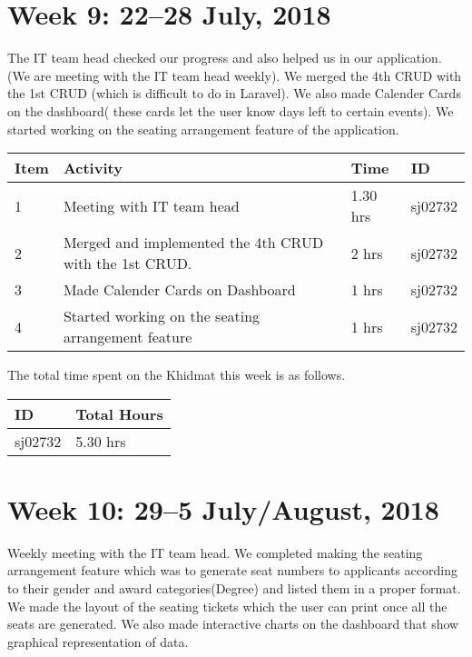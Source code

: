 \documentclass{article}
\begin{document}
\newpage %
\section*{Week 9: 22--28 July, 2018}

The IT team head checked our progress and also helped us in our application. (We are meeting with the IT team head weekly). We merged the 4th CRUD with the 1st CRUD (which is difficult to do in Laravel). We also made Calender Cards on the dashboard( these cards let the user know days left to certain events). We started working on the seating arrangement feature of the application. \newline

\begin{tabular}{|l|l|l|l|}
  \hline
  Item 	& Activity & Time & ID \\\hline\hline
  1	& Meeting with IT team head & 1.30 hrs & sj02732 \\\hline
  2	& Merged and implemented the 4th CRUD with the 1st CRUD. & 2 hrs & sj02732 \\\hline
  3	& Made Calender Cards on Dashboard & 1 hrs & sj02732 \\\hline
  4	& Started working on the seating arrangement feature  & 1 hrs & sj02732 \\\hline
\end{tabular}
\newline
The total time spent on the Khidmat this week is as follows.

\begin{tabular}{|l|l|}
  \hline
  ID & Total Hours\\\hline\hline
  sj02732 & 5.30 hrs\\\hline
\end{tabular}

\newpage %
\section*{Week 10: 29--5 July/August, 2018}

Weekly meeting with the IT team head. We completed making the seating arrangement feature which was to generate seat numbers to applicants according to their gender and award categories(Degree) and listed them in a proper format. We made the layout of the seating tickets which the user can print once all the seats are generated. We also made interactive charts on the dashboard that show graphical representation of data.   \newline
\end{document}
